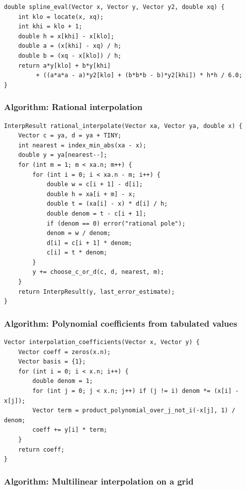 \documentclass[11pt]{article}
\begin{document}
\begin{verbatim}
double spline_eval(Vector x, Vector y, Vector y2, double xq) {
    int klo = locate(x, xq);
    int khi = klo + 1;
    double h = x[khi] - x[klo];
    double a = (x[khi] - xq) / h;
    double b = (xq - x[klo]) / h;
    return a*y[klo] + b*y[khi]
         + ((a*a*a - a)*y2[klo] + (b*b*b - b)*y2[khi]) * h*h / 6.0;
}
\end{verbatim}

\subsubsection{Algorithm: Rational interpolation}\label{algorithm-rational-interpolation}

\begin{verbatim}
InterpResult rational_interpolate(Vector xa, Vector ya, double x) {
    Vector c = ya, d = ya + TINY;
    int nearest = index_min_abs(xa - x);
    double y = ya[nearest--];
    for (int m = 1; m < xa.n; m++) {
        for (int i = 0; i < xa.n - m; i++) {
            double w = c[i + 1] - d[i];
            double h = xa[i + m] - x;
            double t = (xa[i] - x) * d[i] / h;
            double denom = t - c[i + 1];
            if (denom == 0) error("rational pole");
            denom = w / denom;
            d[i] = c[i + 1] * denom;
            c[i] = t * denom;
        }
        y += choose_c_or_d(c, d, nearest, m);
    }
    return InterpResult(y, last_error_estimate);
}
\end{verbatim}

\subsubsection{Algorithm: Polynomial coefficients from tabulated values}\label{algorithm-polynomial-coefficients-from-tabulated-values}

\begin{verbatim}
Vector interpolation_coefficients(Vector x, Vector y) {
    Vector coeff = zeros(x.n);
    Vector basis = {1};
    for (int i = 0; i < x.n; i++) {
        double denom = 1;
        for (int j = 0; j < x.n; j++) if (j != i) denom *= (x[i] - x[j]);
        Vector term = product_polynomial_over_j_not_i(-x[j], 1) / denom;
        coeff += y[i] * term;
    }
    return coeff;
}
\end{verbatim}

\subsubsection{Algorithm: Multilinear interpolation on a grid}\label{algorithm-multilinear-interpolation-on-a-grid}
\end{document}
